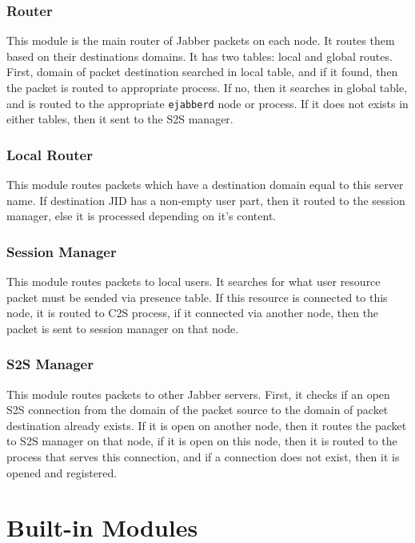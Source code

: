 \documentclass[a4paper,10pt]{article}
\newcommand{\ejabberd}{\texttt{ejabberd}}
\newcommand{\Jabber}{Jabber}
\begin{document}
\subsubsection{Router}

This module is the main router of \Jabber{} packets on each node.  It routes
them based on their destinations domains.  It has two tables: local and global
routes.  First, domain of packet destination searched in local table, and if it
found, then the packet is routed to appropriate process.  If no, then it
searches in global table, and is routed to the appropriate \ejabberd{} node or
process.  If it does not exists in either tables, then it sent to the S2S
manager.


\subsubsection{Local Router}

This module routes packets which have a destination domain equal to this server
name.  If destination JID has a non-empty user part, then it routed to the
session manager, else it is processed depending on it's content.


\subsubsection{Session Manager}

This module routes packets to local users.  It searches for what user resource
packet must be sended via presence table.  If this resource is connected to
this node, it is routed to C2S process, if it connected via another node, then
the packet is sent to session manager on that node.


\subsubsection{S2S Manager}

This module routes packets to other \Jabber{} servers.  First, it checks if an
open S2S connection from the domain of the packet source to the domain of
packet destination already exists. If it is open on another node, then it
routes the packet to S2S manager on that node, if it is open on this node, then
it is routed to the process that serves this connection, and if a connection
does not exist, then it is opened and registered.


\appendix{}

\section{Built-in Modules}
\label{sec:modules}
\end{document}

